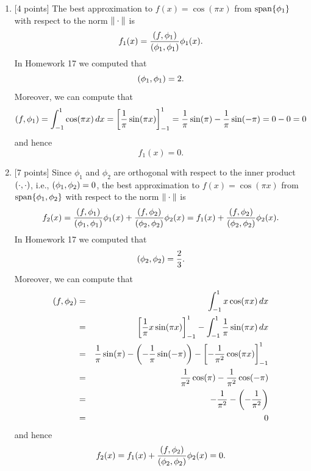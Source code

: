 \begin{solution}

\begin{enumerate}
\item {[4 points]} The best approximation to $f(x) = \cos(\pi x)$ from ${\rm span}\{\phi_1\}$ with respect to the norm $\|\cdot\|$ is
       \[ f_1(x) = {(f,\phi_1) \over (\phi_1, \phi_1)} \phi_1(x).\]
In Homework 17 we computed that
\[
          (\phi_1,\phi_1) =2.
\]
Moreover, we can compute that
\[
          (f,\phi_1) = \int_{-1}^1 \cos(\pi x)\,dx = \left[\frac{1}{\pi}\sin(\pi x)\right]_{-1}^1=\frac{1}{\pi}\sin(\pi)-\frac{1}{\pi}\sin(-\pi)=0-0=0
\]
and hence
       \[ f_1(x) = 0.\]
\item {[7 points]} Since $\phi_1$ and $\phi_2$ are
      orthogonal with respect to the inner product $(\cdot,\cdot)$, i.e., $(\phi_1, \phi_2) = 0$, the best approximation to $f(x) = \cos(\pi x)$ from ${\rm span}\{\phi_1,\phi_2\}$ with respect to the norm $\|\cdot\|$ is
       \[ f_2(x) = {(f,\phi_1) \over (\phi_1, \phi_1)} \phi_1(x) + {(f,\phi_2) \over (\phi_2, \phi_2)} \phi_2(x) = f_1(x) + {(f,\phi_2) \over (\phi_2, \phi_2)} \phi_2(x).\]
In Homework 17 we computed that
      \[
         (\phi_2,\phi_2) = {2\over 3}.
\]
Moreover, we can compute that
\begin{eqnarray*}
(f,\phi_2) &=&\int_{-1}^1 x\cos(\pi x)\,dx 
\\
&=&\left[\frac{1}{\pi}x\sin(\pi x)\right]_{-1}^1-\int_{-1}^1 \frac{1}{\pi}\sin(\pi x)\,dx 
\\
&=& \frac{1}{\pi}\sin(\pi)-\left(-\frac{1}{\pi}\sin(-\pi)\right)-\left[-\frac{1}{\pi^2}\cos(\pi x)\right]_{-1}^1 
\\
&=& \frac{1}{\pi^2}\cos(\pi)-\frac{1}{\pi^2}\cos(-\pi)
\\
&=&-\frac{1}{\pi^2}-\left(-\frac{1}{\pi^2}\right)
\\
&=&0
\end{eqnarray*}
and hence
       \[ f_2(x) = f_1(x)
                  + {(f,\phi_2) \over (\phi_2, \phi_2)} \phi_2(x) = 0.\]
  


\end{enumerate}
\end{solution}
